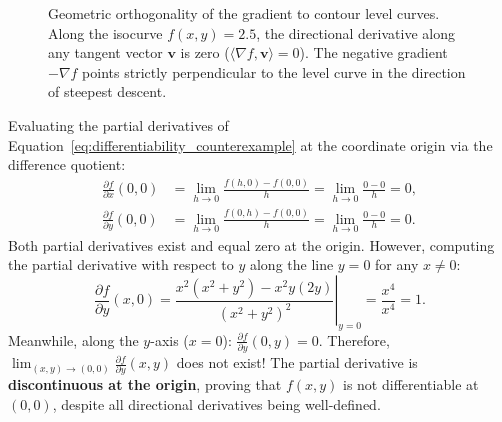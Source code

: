 \begin{figure}[htbp]
\begin{minipage}{0.48\linewidth}
  \caption{Geometric orthogonality of the gradient to contour level curves. Along the isocurve $f(x, y) = 2.5$, the directional derivative along any tangent vector $\mathbf{v}$ is zero ($\langle \nabla f, \mathbf{v} \rangle = 0$). The negative gradient $-\nabla f$ points strictly perpendicular to the level curve in the direction of steepest descent.}
  \label{fig:gradient_orthogonal_level_curves}
\end{minipage}
\end{figure}

Evaluating the partial derivatives of Equation~\eqref{eq:differentiability_counterexample} at the coordinate origin via the difference quotient:
\begin{align}
\frac{\partial f}{\partial x}(0, 0) &= \lim_{h \to 0} \frac{f(h, 0) - f(0, 0)}{h} = \lim_{h \to 0} \frac{0 - 0}{h} = 0, \\
\frac{\partial f}{\partial y}(0, 0) &= \lim_{h \to 0} \frac{f(0, h) - f(0, 0)}{h} = \lim_{h \to 0} \frac{0 - 0}{h} = 0.
\end{align}
Both partial derivatives exist and equal zero at the origin. However, computing the partial derivative with respect to $y$ along the line $y = 0$ for any $x \ne 0$:
\begin{equation}
\frac{\partial f}{\partial y}(x, 0) = \left. \frac{x^2(x^2 + y^2) - x^2 y(2y)}{(x^2 + y^2)^2} \right|_{y=0} = \frac{x^4}{x^4} = 1.
\end{equation}
Meanwhile, along the $y$-axis ($x = 0$): $\frac{\partial f}{\partial y}(0, y) = 0$. Therefore, $\lim_{(x, y) \to (0, 0)} \frac{\partial f}{\partial y}(x, y)$ does not exist! The partial derivative is \textbf{discontinuous at the origin}, proving that $f(x, y)$ is not differentiable at $(0, 0)$, despite all directional derivatives being well-defined.

